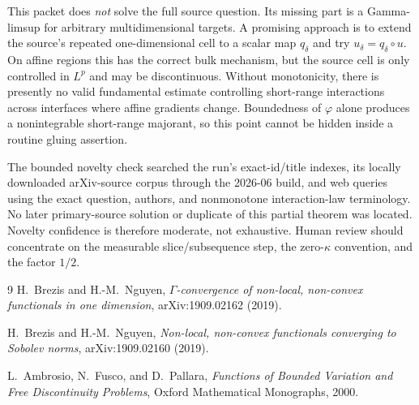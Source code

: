 \documentclass[11pt]{article}
\begin{document}
This packet does \emph{not} solve the full source question.  Its missing part
is a Gamma-limsup for arbitrary multidimensional targets.  A promising
approach is to extend the source's repeated one-dimensional cell to a scalar
map $q_\delta$ and try $u_\delta=q_\delta\circ u$.  On affine regions this has
the correct bulk mechanism, but the source cell is only controlled in
$L^p$ and may be discontinuous.  Without monotonicity, there is presently no
valid fundamental estimate controlling short-range interactions across
interfaces where affine gradients change.  Boundedness of $\varphi$ alone
produces a nonintegrable short-range majorant, so this point cannot be hidden
inside a routine gluing assertion.

The bounded novelty check searched the run's exact-id/title indexes, its
locally downloaded arXiv-source corpus through the 2026-06 build, and web
queries using the exact question, authors, and nonmonotone interaction-law
terminology.  No later primary-source solution or duplicate of this partial
theorem was located.  Novelty confidence is therefore moderate, not
exhaustive.  Human review should concentrate on the measurable
slice/subsequence step, the zero-$\kappa$ convention, and the factor $1/2$.

\begin{thebibliography}{9}
H.~Brezis and H.-M.~Nguyen,
\emph{$\Gamma$-convergence of non-local, non-convex functionals in one
dimension}, arXiv:1909.02162 (2019).

H.~Brezis and H.-M.~Nguyen,
\emph{Non-local, non-convex functionals converging to Sobolev norms},
arXiv:1909.02160 (2019).

L.~Ambrosio, N.~Fusco, and D.~Pallara,
\emph{Functions of Bounded Variation and Free Discontinuity Problems},
Oxford Mathematical Monographs, 2000.
\end{thebibliography}
\end{document}
